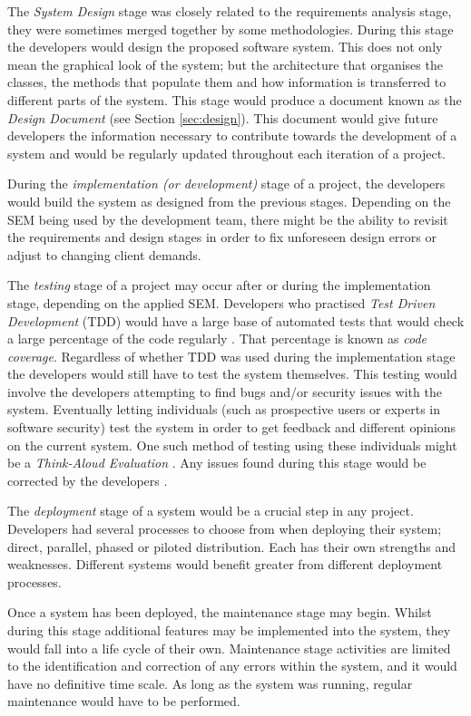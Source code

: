 \documentclass[final]{cmpreport}
\begin{document}
			The \emph{System Design} stage was closely related to the requirements analysis stage, they were sometimes merged together by some methodologies. During this stage the developers would design the proposed software system. This does not only mean the graphical look of the system; but the architecture that organises the classes, the methods that populate them and how information is transferred to different parts of the system. This stage would produce a document known as the \emph{Design Document} (see Section \ref{sec:design}). This document would give future developers the information necessary to contribute towards the development of a system and would be regularly updated throughout each iteration of a project.
			
			During the \emph{implementation (or development)} stage of a project, the developers would build the system as designed from the previous stages. Depending on the SEM being used by the development team, there might be the ability to revisit the requirements and design stages in order to fix unforeseen design errors or adjust to changing client demands. 
			
			The \emph{testing} stage of a project may occur after or during the implementation stage, depending on the applied SEM. Developers who practised \emph{Test Driven Development} (TDD) would have a large base of automated tests that would check a large percentage of the code regularly \citep{TDD}. That percentage is known as \emph{code coverage}. Regardless of whether TDD was used during the implementation stage the developers would still have to test the system themselves. This testing would involve the developers attempting to find bugs and/or security issues with the system. Eventually letting individuals (such as prospective users or experts in software security) test the system in order to get feedback and different opinions on the current system. One such method of testing using these individuals might be a \emph{Think-Aloud Evaluation} \citep{thinkaloud}. Any issues found during this stage would be corrected by the developers \citep{testing}.
			
			The \emph{deployment} stage of a system would be a crucial step in any project. Developers had several processes to choose from when deploying their system; direct, parallel, phased or piloted distribution. Each has their own strengths and weaknesses. Different systems would benefit greater from different deployment processes. 
			
			Once a system has been deployed, the maintenance stage may begin. Whilst during this stage additional features may be implemented into the system, they would fall into a life cycle of their own. Maintenance stage activities are limited to the identification and correction of any errors within the system, and it would have no definitive time scale. As long as the system was running, regular maintenance would have to be performed.
						
\end{document}
